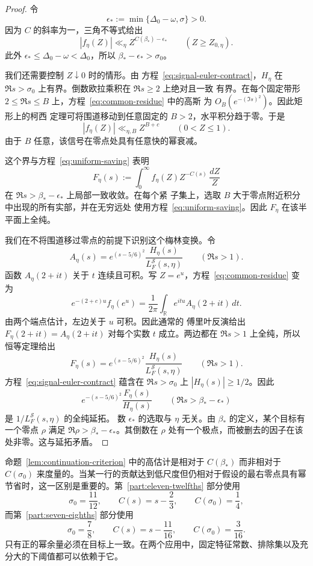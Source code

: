 \documentclass[11pt,a4paper]{article}
\numberwithin{equation}{section}
\numberwithin{figure}{section}
\theoremstyle{definition}
\theoremstyle{remark}
\begin{document}
\begin{proof}
令
\[
 \epsilon_*:=\min\{\Delta_0-\omega,\sigma\}>0.
\]
因为 $C$ 的斜率为一，三角不等式给出
\begin{equation}
 |f_\eta(Z)|\ll_\eta Z^{C(\beta_*)-\epsilon_*}
 \qquad (Z\ge Z_{0,\eta}).
 \label{eq:uniform-saving}
\end{equation}
此外 $\epsilon_*\le\Delta_0-\omega<\Delta_0$，所以
$\beta_*-\epsilon_*>\sigma_0$。

我们还需要控制 $Z\downarrow0$ 时的情形。由
方程~\eqref{eq:signal-euler-contract}，$H_\eta$ 在
$\Re s>\sigma_0$ 上有界。倒数欧拉乘积在 $\Re s\ge2$ 上绝对且一致
有界。在每个固定带形 $2\le\Re s\le B$ 上，方程~\eqref{eq:common-residue} 中的高斯
为 $O_B(e^{-(\Im s)^2})$。因此矩形上的柯西
定理可将围道移动到任意固定的 $B>2$，水平积分趋于零。于是
\[
 |f_\eta(Z)|\ll_{\eta,B}Z^{B+c}\qquad(0<Z\le1).
\]
由于 $B$ 任意，该信号在零点处具有任意快的幂衰减。

这个界与方程~\eqref{eq:uniform-saving} 表明
\[
 F_\eta(s):=\int_0^\infty f_\eta(Z)Z^{-C(s)}\,\frac{dZ}{Z}
\]
在 $\Re s>\beta_*-\epsilon_*$ 上局部一致收敛。在每个紧
子集上，选取 $B$ 大于零点附近积分中出现的所有实部，并在无穷远处
使用方程~\eqref{eq:uniform-saving}。因此 $F_\eta$
在该半平面上全纯。

我们在不将围道移过零点的前提下识别这个梅林变换。令
\[
 A_\eta(s)=e^{(s-5/6)^2}
             \frac{H_\eta(s)}{L_F^{\mathcal S}(s,\eta)}
 \qquad(\Re s>1).
\]
函数 $A_\eta(2+it)$ 关于 $t$ 连续且可积。写
$Z=e^u$，方程~\eqref{eq:common-residue} 变为
\[
 e^{-(2+c)u}f_\eta(e^u)
   =\frac1{2\pi}\int_{\mathbb R}e^{itu}A_\eta(2+it)\,dt.
\]
由两个端点估计，左边关于 $u$ 可积。因此通常的
傅里叶反演给出 $F_\eta(2+it)=A_\eta(2+it)$ 对每个实数
$t$ 成立。两边都在 $\Re s>1$ 上全纯，所以恒等定理给出
\[
 F_\eta(s)=e^{(s-5/6)^2}
             \frac{H_\eta(s)}{L_F^{\mathcal S}(s,\eta)}
 \qquad(\Re s>1).
\]方程~\eqref{eq:signal-euler-contract} 蕴含在
$\Re s>\sigma_0$ 上 $|H_\eta(s)|\ge1/2$。因此
\[
 e^{-(s-5/6)^2}\frac{F_\eta(s)}{H_\eta(s)}
 \qquad(\Re s>\beta_*-\epsilon_*)
\]
是 $1/L_F^{\mathcal S}(s,\eta)$ 的全纯延拓。
数 $\epsilon_*$ 的选取与 $\eta$ 无关。由 $\beta_*$ 的定义，某个目标有一个零点 $\rho$ 满足
$\Re\rho>\beta_*-\epsilon_*$。其倒数在 $\rho$ 处有一个极点，而被删去的因子在该处非零。这与延拓矛盾。
\end{proof}

命题~\ref{lem:continuation-criterion} 中的高估计是相对于 $C(\beta_*)$ 而非相对于 $C(\sigma_0)$ 来度量的。当某一行的贡献达到低尺度但仍相对于假设的最右零点具有幂节省时，这一区别是重要的。第~\ref{part:eleven-twelfths} 部分使用
\[
 \sigma_0=\frac{11}{12},\qquad C(s)=s-\frac23,
 \qquad C(\sigma_0)=\frac14,
\]
而第~\ref{part:seven-eighths} 部分使用
\[
 \sigma_0=\frac78,\qquad C(s)=s-\frac{11}{16},
 \qquad C(\sigma_0)=\frac3{16}.
\]
只有正的幂余量必须在目标上一致。在两个应用中，固定特征常数、排除集以及充分大的下阈值都可以依赖于它。
\end{document}
